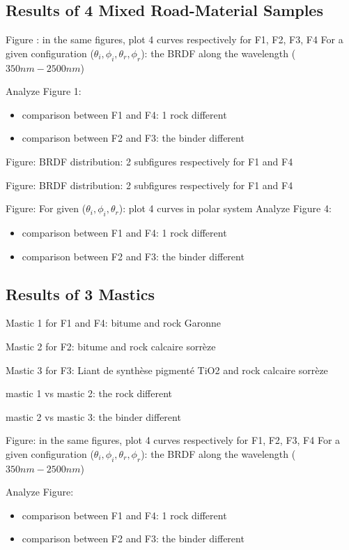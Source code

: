 \subsection{Results of 4 Mixed Road-Material Samples}

Figure : in the same figures, plot 4 curves respectively for F1, F2, F3, F4
For a given configuration ($\theta_i, \phi_i, \theta_r, \phi_r$): the BRDF along the wavelength ($350nm - 2500nm$)

Analyze Figure 1:
\begin{itemize}
    \item comparison between F1 and F4: 1 rock different
    \item comparison between F2 and F3: the binder different
\end{itemize}


Figure:
BRDF distribution: 2 subfigures respectively for F1 and F4


Figure:
BRDF distribution: 2 subfigures respectively for F1 and F4


Figure:
For given ($\theta_i, \phi_i, \theta_r$): plot 4 curves in polar system
Analyze Figure 4:
\begin{itemize}
    \item comparison between F1 and F4: 1 rock different
    \item comparison between F2 and F3: the binder different
\end{itemize}

\subsection{Results of 3 Mastics}

Mastic 1 for F1 and F4: bitume and rock Garonne

Mastic 2  for F2: bitume and rock calcaire sorrèze

Mastic 3 for F3: Liant de synthèse pigmenté TiO2 and rock calcaire sorrèze


mastic 1 vs mastic 2: the rock different

mastic 2 vs mastic 3: the binder different


Figure: in the same figures, plot 4 curves respectively for F1, F2, F3, F4
For a given configuration ($\theta_i, \phi_i, \theta_r, \phi_r$): the BRDF along the wavelength ($350nm - 2500nm$)

Analyze Figure:
\begin{itemize}
    \item comparison between F1 and F4: 1 rock different
    \item comparison between F2 and F3: the binder different
\end{itemize}


